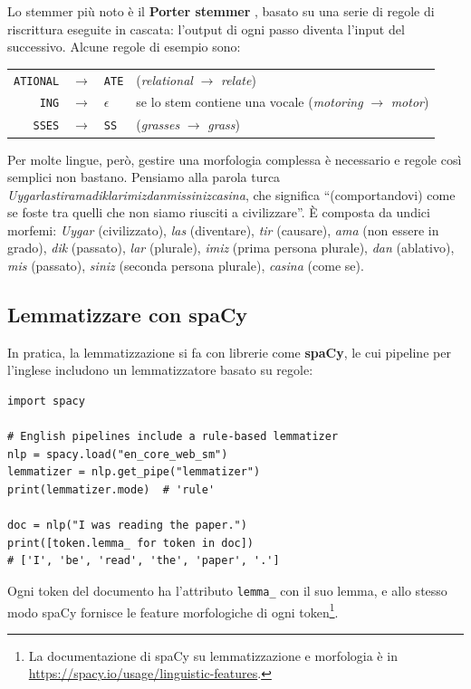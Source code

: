 Lo stemmer più noto è il \textbf{Porter stemmer} \cite{porter1980}, basato su una serie di regole di riscrittura eseguite in cascata: l'output di ogni passo diventa l'input del successivo. Alcune regole di esempio sono:
\begin{center}
\begin{tabular}{rcll}
\texttt{ATIONAL} & $\to$ & \texttt{ATE} & (\textit{relational} $\to$ \textit{relate}) \\
\texttt{ING} & $\to$ & $\epsilon$ & se lo stem contiene una vocale (\textit{motoring} $\to$ \textit{motor}) \\
\texttt{SSES} & $\to$ & \texttt{SS} & (\textit{grasses} $\to$ \textit{grass}) \\
\end{tabular}
\end{center}

Per molte lingue, però, gestire una morfologia complessa è necessario e regole così semplici non bastano. Pensiamo alla parola turca \textit{Uygarlastiramadiklarimizdanmissinizcasina}, che significa \enquote{(comportandovi) come se foste tra quelli che non siamo riusciti a civilizzare}. È composta da undici morfemi: \textit{Uygar} (civilizzato), \textit{las} (diventare), \textit{tir} (causare), \textit{ama} (non essere in grado), \textit{dik} (passato), \textit{lar} (plurale), \textit{imiz} (prima persona plurale), \textit{dan} (ablativo), \textit{mis} (passato), \textit{siniz} (seconda persona plurale), \textit{casina} (come se).

\subsection{Lemmatizzare con spaCy}
In pratica, la lemmatizzazione si fa con librerie come \textbf{spaCy}, le cui pipeline per l'inglese includono un lemmatizzatore basato su regole:
\begin{lstlisting}[style=py]
import spacy

# English pipelines include a rule-based lemmatizer
nlp = spacy.load("en_core_web_sm")
lemmatizer = nlp.get_pipe("lemmatizer")
print(lemmatizer.mode)  # 'rule'

doc = nlp("I was reading the paper.")
print([token.lemma_ for token in doc])
# ['I', 'be', 'read', 'the', 'paper', '.']
\end{lstlisting}
Ogni token del documento ha l'attributo \texttt{lemma\_} con il suo lemma, e allo stesso modo spaCy fornisce le feature morfologiche di ogni token\footnote{La documentazione di spaCy su lemmatizzazione e morfologia è in \url{https://spacy.io/usage/linguistic-features}.}.

